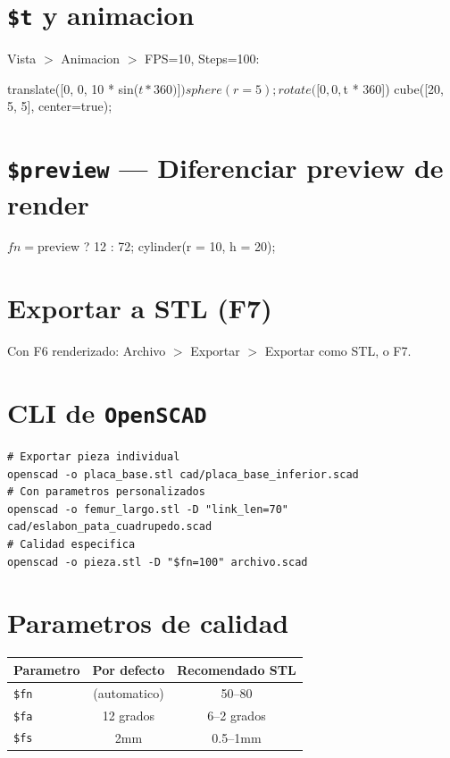 \documentclass[12pt, oneside, a4paper]{report}
\newcommand{\openscadlogo}{\texttt{OpenSCAD}}
\newcommand{\codigo}[1]{\texttt{#1}}
\begin{document}
\section{\codigo{\$t} y animacion}
Vista $>$ Animacion $>$ FPS=10, Steps=100:
\begin{openscad}
translate([0, 0, 10 * sin($t * 360)]) sphere(r = 5);
rotate([0, 0, $t * 360]) cube([20, 5, 5], center=true);
\end{openscad}

\section{\codigo{\$preview} --- Diferenciar preview de render}
\begin{openscad}
$fn = $preview ? 12 : 72;
cylinder(r = 10, h = 20);
\end{openscad}

\section{Exportar a STL (F7)}
Con F6 renderizado: Archivo $>$ Exportar $>$ Exportar como STL, o F7.

\section{CLI de \openscadlogo}
{\small
\begin{verbatim}
# Exportar pieza individual
openscad -o placa_base.stl cad/placa_base_inferior.scad
# Con parametros personalizados
openscad -o femur_largo.stl -D "link_len=70" cad/eslabon_pata_cuadrupedo.scad
# Calidad especifica
openscad -o pieza.stl -D "$fn=100" archivo.scad
\end{verbatim}
}

\section{Parametros de calidad}
\begin{center}
\begin{tabular}{lcc}
\toprule
Parametro & Por defecto & Recomendado STL \\
\midrule
\codigo{\$fn} & (automatico) & 50--80 \\
\codigo{\$fa} & 12 grados & 6--2 grados \\
\codigo{\$fs} & 2mm & 0.5--1mm \\
\bottomrule
\end{tabular}
\end{center}
\end{document}
